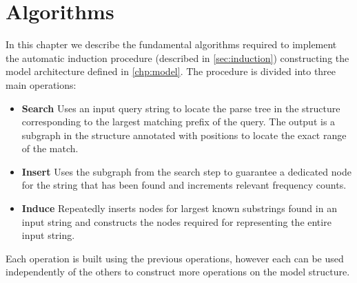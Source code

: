 \chapter{Algorithms}


In this chapter we describe the fundamental algorithms required to implement the automatic induction procedure (described in \ref{sec:induction}) constructing the model architecture defined in \ref{chp:model}. The procedure is divided into three main operations:

\begin{itemize}
\item \textbf{Search} Uses an input query string to locate the parse tree in the structure corresponding to the largest matching prefix of the query. The output is a subgraph in the structure annotated with positions to locate the exact range of the match. 
\item \textbf{Insert} Uses the subgraph from the search step to guarantee a dedicated node for the string that has been found and increments relevant frequency counts.
\item \textbf{Induce} Repeatedly inserts nodes for largest known substrings found in an input string and constructs the nodes required for representing the entire input string.
\end{itemize}

Each operation is built using the previous operations, however each can be used independently of the others to construct more operations on the model structure.






